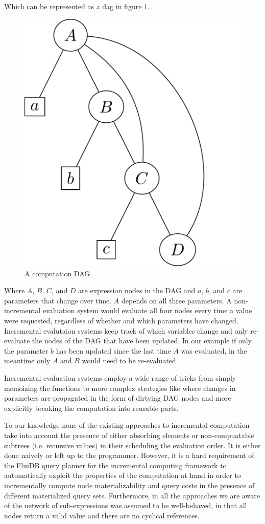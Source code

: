 Which can be represented as a dag in figure
\ref{fig:example_antisthenis_dag}.

\begin{figure}[H]
\centering
\includegraphics[width=.5\textwidth]{./imgs/example_antisthenis_dag.pdf}
\caption{\label{fig:example_antisthenis_dag}A computation DAG.}
\end{figure}

Where \(A\), \(B\), \(C\), and \(D\) are expression nodes in the DAG
and \(a\), \(b\), and \(c\) are parameters that change over
time. \(A\) depends on all three parameters. A non-incremental
evaluation system would evaluate all four nodes every time a value
were requested, regardless of whether and which parameters have
changed. Incremental evalutaion systems keep track of which variables
change and only re-evaluate the nodes of the DAG that have been
updated. In our example if only the parameter \(b\) has been updated
since the last time \(A\) was evaluated, in the meantime only \(A\)
and \(B\) would need to be re-evaluated.

Incremental evaluation systems employ a wide range of tricks from
simply memoizing the functions
\cite{pughIncrementalComputationFunction1989} to more complex
strategies like \cite{hammerAdaptonComposableDemanddriven2014a} where
changes in parameters are propagated in the form of dirtying DAG nodes
and more explicitly breaking the computation into reusable parts.

To our knowledge none of the existing approaches to incremental
computation take into account the presence of either absorbing
elements or non-compuatable subtrees (i.e. recursive values) in their
scheduling the evaluation order. It is either done naively or left up
to the programmer. However, it is a hard requirement of the FluiDB
query planner for the incremental computing framework to automatically
exploit the properties of the computation at hand in order to
incrementally compute node materializability and query costs in the
presence of different materialized query sets. Furthermore, in all the
approaches we are aware of the network of sub-expressions was assumed
to be well-behaved, in that all nodes return a valid value and there
are no cyclical references.

